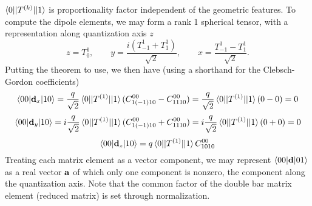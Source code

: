 \documentclass[10pt,letterpaper]{article}
\begin{document}
$\braket{0||T^{(k)}||1}$ is proportionality factor independent of the geometric features. To compute the dipole elements,
we may form a rank 1 spherical tensor, with a representation along quantization axis $z$
\[
	z = T^1_0,\qquad y = \frac{i(T_{-1}^1+T_1^1)}{\sqrt 2},\qquad x = \frac{T^1_{-1}-T^1_1}{\sqrt 2}.
\]
Putting the theorem to use, we then have (using a shorthand for the Clebsch-Gordon coefficients)
\[
	\braket{00|\mathbf{d}_x|10}= \frac{q}{\sqrt 2}\braket{0||T^{(1)}||1}(C^{00}_{1(-1)10}-C^{00}_{1110}) = 
	 \frac{q}{\sqrt 2}\braket{0||T^{(1)}||1}(0-0) =0
\]
\[
	\braket{00|\mathbf{d}_y|10}= i\frac{q}{\sqrt 2}\braket{0||T^{(1)}||1}(C^{00}_{1(-1)10}+C^{00}_{1110}) = 
	 i\frac{q}{\sqrt 2}\braket{0||T^{(1)}||1}(0+0) =0
\]
\[
	\braket{00|\mathbf{d}_z|10}= q\braket{0||T^{(1)}||1}C^{00}_{1010}
\]
Treating each matrix element as a vector component, we may represent $\braket{00|\mathbf{d}|01}$ as a real vector $\mathbf{a}$ of which only one component is nonzero, the component along the quantization axis. Note that the common factor of the double bar matrix element (reduced matrix) is set through normalization. 

\eenum
\end{document}
